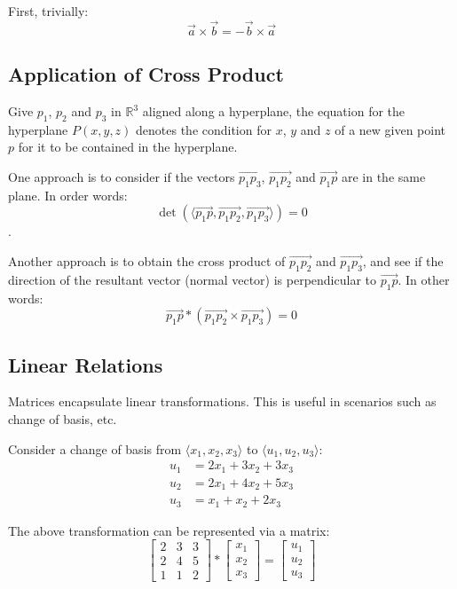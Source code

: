 \documentclass[12pt]{article}
\newcommand{\RR}{\mathbb{R}}
\newcommand{\iv}[1]{\langle #1 \rangle}
\theoremstyle{definition}
\begin{document}
	First, trivially: $$\vec{a} \times \vec{b} = -\vec{b} \times \vec{a}$$
	
	\subsection{Application of Cross Product}
	
	Give $p_1$, $p_2$ and $p_3$ in $\RR^3$ aligned along a hyperplane, the equation for the hyperplane $P(x, y, z)$ denotes the condition for $x$, $y$ and $z$ of a new given point $p$ for it to be contained in the hyperplane.
	
	One approach is to consider if the vectors $\overrightarrow{p_1p_3}$, $\overrightarrow{p_1p_2}$ and $\overrightarrow{p_1p}$ are in the same plane. In order words: $$\det(\iv{\overrightarrow{p_1p}, \overrightarrow{p_1p_2}, \overrightarrow{p_1p_3}}) = 0$$.
	
	Another approach is to obtain the cross product of $\overrightarrow{p_1p_2}$ and $\overrightarrow{p_1p_3}$, and see if the direction of the resultant vector (normal vector) is perpendicular to $\overrightarrow{p_1p}$. In other words: $$\overrightarrow{p_1p} * (\overrightarrow{p_1p_2} \times \overrightarrow{p_1p_3}) =  0$$
	
	\subsection{Linear Relations}
	
	Matrices encapsulate linear transformations. This is useful in scenarios such as change of basis, etc.
	
	Consider a change of basis from $\iv{x_1, x_2, x_3}$ to $\iv{u_1, u_2, u_3}$:
	\begin{align*}
		u_1 &= 2x_1 + 3x_2 + 3x_3 \\
		u_2 &= 2x_1 + 4x_2 + 5x_3 \\
		u_3 &= x_1 + x_2 + 2x_3
	\end{align*}
	
	The above transformation can be represented via a matrix:
	\begin{equation*}
		\begin{bmatrix}
			2 & 3 & 3 \\ 2 & 4 & 5 \\ 1 & 1 & 2
		\end{bmatrix} * \begin{bmatrix}
			x_1 \\ x_2 \\ x_3
		\end{bmatrix} = \begin{bmatrix}
			u_1 \\ u_2 \\ u_3
		\end{bmatrix}
	\end{equation*}
	
\end{document}
